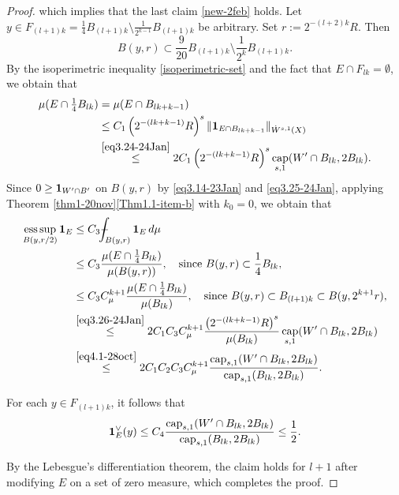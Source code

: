 \documentclass[11pt,leqno]{amsart}
\def\Xint#1{\mathchoice
	{\XXint\displaystyle\textstyle{#1}}
	{\XXint\textstyle\scriptstyle{#1}}
	{\XXint\scriptstyle\scriptscriptstyle{#1}}
	{\XXint\scriptscriptstyle\scriptscriptstyle{#1}}
	\!\int}
\def\XXint#1#2#3{{\setbox0=\hbox{$#1{#2#3}{\int}$ }
		\vcenter{\hbox{$#2#3$ }}\kern-.6\wd0}}
\def\dashint{\Xint-}
\numberwithin{equation}{section}
\theoremstyle{definition}
\DeclareMathOperator{\capp}{cap}
\newcommand{\caps}{\capp_{s,1}}
\DeclareMathOperator*{\esssup}{ess\,sup}
\begin{document}
\begin{proof}
		which implies that  the last claim \eqref{new-2feb} holds.
		Let $y\in F_{(l+1)k}=\frac{1}{4}B_{(l+1)k}\setminus \frac{1}{2^{k-1}}B_{(l+1)k}$ be arbitrary.
		Set $r:=2^{-(l+2)k}R $. Then 
		\begin{equation}\label{eq3.25-24Jan}
			B(y,r)\subset \frac{9}{20} B_{(l+1)k}\setminus \frac{1}{2^k}B_{(l+1)k}.
		\end{equation}
		By the isoperimetric inequality \eqref{isoperimetric-set} and the fact that $E\cap F_{lk}=\emptyset$, we obtain that
		\begin{align}
			\mu(E\cap \tfrac{1}{4}B_{lk})
			&=\mu(E\cap B_{lk+k-1})\notag\\
			&\le C_1\left(2^{-(lk+k-1)}R\right)^s \|{\bf 1}_{E\cap B_{lk+k-1}}\|_{\dot W^{s,1}(X)}\notag\\
			&\overset{\eqref{eq3.24-24Jan}}{\le }2C_1\left(2^{-(lk+k-1)}R\right)^s\caps(W'\cap B_{lk}, 2B_{lk}).
			\label{eq3.26-24Jan}
		\end{align}
		Since 
		{$0\geq {\bf 1}_{W'\cap B'}$}
		on $B(y,r)$ by \eqref{eq3.14-23Jan} and \eqref{eq3.25-24Jan}, applying Theorem \ref{thm1-20nov}\ref{Thm1.1-item-b} with $k_0=0$, we obtain that
		\begin{align*}
			\esssup_{B(y,r/2)}{\bf 1}_E
			&\le C_3  \dashint_{B(y,r)}{\bf 1}_E\,d\mu\\
			&\le C_3\frac{\mu(E\cap \frac{1}{4}B_{lk})}{\mu(B(y,r))},\quad \text{since }B(y,r)\subset \frac{1}{4}B_{lk},\\
			&\le C_3C_{\mu}^{k+1}\frac{\mu(E\cap \frac{1}{4}B_{lk})}{\mu(B_{lk})},\quad \text{since }
			B(y, r)\subset B_{(l+1)k}\subset B(y, 2^{k+1}r),\\
			&\overset{\eqref{eq3.26-24Jan}}{\le}2C_1C_3C_{\mu}^{k+1}\frac{\left(2^{-(lk+k-1)}R \right)^s}{\mu(B_{lk})}\caps(W'\cap B_{lk}, 2B_{lk})\\
			&\overset{\eqref{eq4.1-28oct}}{\le }2C_1C_2C_3C_{\mu}^{k+1} \frac{\caps(W'\cap B_{lk},2B_{lk})}{\caps(B_{lk},2B_{lk})}.
		\end{align*}
		
		For each $y\in F_{(l+1)k}$, it follows that
		\[
		{\bf 1}_{E}^\vee(y)
		\le C_4\frac{\caps(W'\cap B_{lk},2B_{lk})}{{\rm cap}_{s,1}(B_{lk},2B_{lk})}\le\frac{1}{2}.
		\]
		
		By the Lebesgue's differentiation theorem, the claim holds for $l+1$ after modifying $E$ on a set of zero measure, which completes the proof.
	\end{proof}
	
\end{document}
